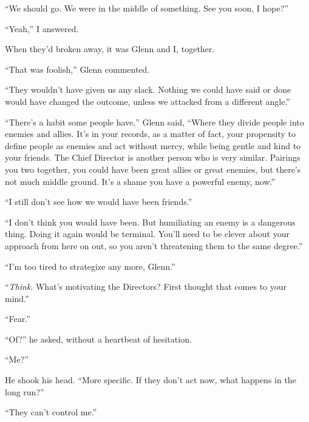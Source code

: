 ``We should go.  We were in the middle of something.  See you soon, I hope?''



``Yeah,'' I answered.



When they'd broken away, it was Glenn and I, together.



``That was foolish,'' Glenn commented.



``They wouldn't have given us any slack.  Nothing we could have said or done would have changed the outcome, unless we attacked from a different angle.''



``There's a habit some people have,'' Glenn said, ``Where they divide people into enemies and allies.  It's in your records, as a matter of fact, your propensity to define people as enemies and act without mercy, while being gentle and kind to your friends.  The Chief Director is another person who is very similar.  Pairings you two together, you could have been great allies or great enemies, but there's not much middle ground.  It's a shame you have a powerful enemy, now.''



``I still don't see how we would have been friends.''



``I don't think you would have been.  But humiliating an enemy is a dangerous thing.  Doing it again would be terminal.  You'll need to be clever about your approach from here on out, so you aren't threatening them to the same degree.''



``I'm too tired to strategize any more, Glenn.''



``\emph{Think}.  What's motivating the Directors?  First thought that comes to your mind.''



``Fear.''



``Of?'' he asked, without a heartbeat of hesitation.



``Me?''



He shook his head.  ``More specific.  If they don't act now, what happens in the long run?''



``They can't control me.''



